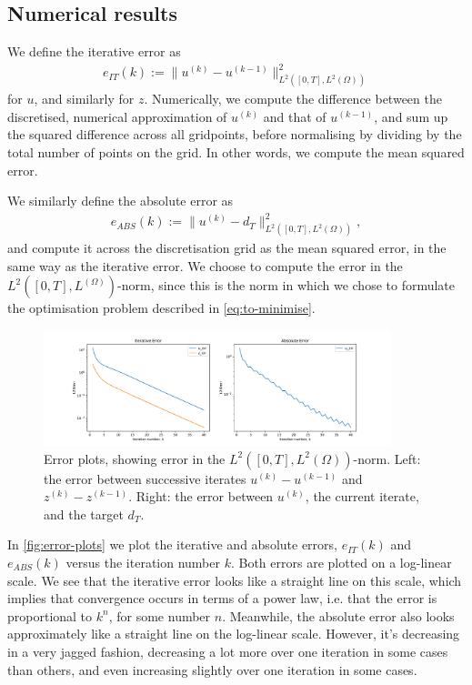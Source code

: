 \subsection{Numerical results}

We define the iterative error as
%
\begin{align} 
    e_{IT}(k) := \lVert u^{(k)}-u^{(k-1)} \rVert^2_{L^2([0,T],L^2(\Omega))}
\end{align}
%
for $u$, and similarly for $z$. Numerically, we compute the difference between the discretised, numerical approximation of $u^{(k)}$ and that of $u^{(k-1)}$, and sum up the squared difference across all gridpoints, before normalising by dividing by the total number of points on the grid. In other words, we compute the mean squared error.

We similarly define the absolute error as 
%
\begin{align} 
    e_{ABS}(k) := \lVert u^{(k)}-d_T \rVert^2_{L^2([0,T],L^2(\Omega))},
\end{align}
%
and compute it across the discretisation grid as the mean squared error, in the same way as the iterative error. We choose to compute the error in the $L^2([0,T],L^(\Omega))$-norm, since this is the norm in which we chose to formulate the optimisation problem described in \autoref{eq:to-minimise}. 

\begin{figure}[ht]
    \centering
    \includegraphics[width=0.9\textwidth]{error_plots_iii.pdf}
    \caption{Error plots, showing error in the $L^2([0,T],L^2(\Omega))$-norm. Left: the error between successive iterates $u^{(k)}-u^{(k-1)}$ and $z^{(k)}-z^{(k-1)}$. Right: the error between $u^{(k)}$, the current iterate, and the target $d_T$.}\label{fig:error-plots}
\end{figure}

In \autoref{fig:error-plots} we plot the iterative and absolute errors, $e_{IT}(k)$ and $e_{ABS}(k)$ versus the iteration number $k$. Both errors are plotted on a log-linear scale. We see that the iterative error looks like a straight line on this scale, which implies that convergence occurs in terms of a power law, i.e. that the error is proportional to $k^{n}$, for some number $n$. Meanwhile, the absolute error also looks approximately like a straight line on the log-linear scale. However, it's decreasing in a very jagged fashion, decreasing a lot more over one iteration in some cases than others, and even increasing slightly over one iteration in some cases.

